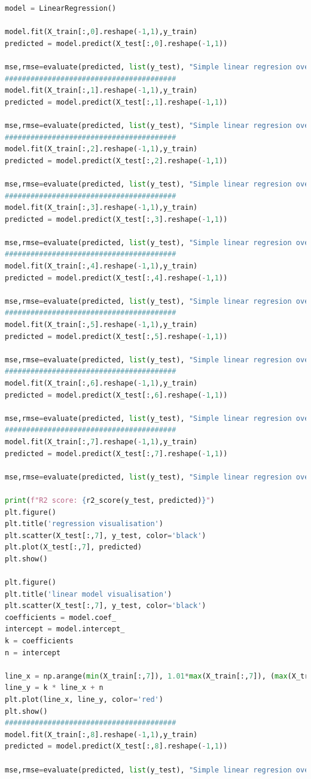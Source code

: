 \documentclass[fontsize=12bp, paper=a4]{scrarticle}
\begin{document}
\begin{lstlisting}[language=Python, caption=Postupak evaluacija naspram svakog feature-a ponaosob.]
model = LinearRegression()

model.fit(X_train[:,0].reshape(-1,1),y_train)
predicted = model.predict(X_test[:,0].reshape(-1,1))

mse,rmse=evaluate(predicted, list(y_test), "Simple linear regresion over longitude")
########################################
model.fit(X_train[:,1].reshape(-1,1),y_train)
predicted = model.predict(X_test[:,1].reshape(-1,1))

mse,rmse=evaluate(predicted, list(y_test), "Simple linear regresion over latitude")
########################################
model.fit(X_train[:,2].reshape(-1,1),y_train)
predicted = model.predict(X_test[:,2].reshape(-1,1))

mse,rmse=evaluate(predicted, list(y_test), "Simple linear regresion over housing_median_age")
########################################
model.fit(X_train[:,3].reshape(-1,1),y_train)
predicted = model.predict(X_test[:,3].reshape(-1,1))

mse,rmse=evaluate(predicted, list(y_test), "Simple linear regresion over total_rooms")
########################################
model.fit(X_train[:,4].reshape(-1,1),y_train)
predicted = model.predict(X_test[:,4].reshape(-1,1))

mse,rmse=evaluate(predicted, list(y_test), "Simple linear regresion over total_bedrooms")
########################################
model.fit(X_train[:,5].reshape(-1,1),y_train)
predicted = model.predict(X_test[:,5].reshape(-1,1))

mse,rmse=evaluate(predicted, list(y_test), "Simple linear regresion over population")
########################################
model.fit(X_train[:,6].reshape(-1,1),y_train)
predicted = model.predict(X_test[:,6].reshape(-1,1))

mse,rmse=evaluate(predicted, list(y_test), "Simple linear regresion over households")
########################################
model.fit(X_train[:,7].reshape(-1,1),y_train)
predicted = model.predict(X_test[:,7].reshape(-1,1))

mse,rmse=evaluate(predicted, list(y_test), "Simple linear regresion over median_income")

print(f"R2 score: {r2_score(y_test, predicted)}")
plt.figure()
plt.title('regression visualisation')
plt.scatter(X_test[:,7], y_test, color='black')
plt.plot(X_test[:,7], predicted)
plt.show()

plt.figure()
plt.title('linear model visualisation')
plt.scatter(X_test[:,7], y_test, color='black')
coefficients = model.coef_
intercept = model.intercept_
k = coefficients
n = intercept

line_x = np.arange(min(X_train[:,7]), 1.01*max(X_train[:,7]), (max(X_train[:,7])- min(X_train[:,7]))/10)
line_y = k * line_x + n
plt.plot(line_x, line_y, color='red')
plt.show()
########################################
model.fit(X_train[:,8].reshape(-1,1),y_train)
predicted = model.predict(X_test[:,8].reshape(-1,1))

mse,rmse=evaluate(predicted, list(y_test), "Simple linear regresion over ocean_proximity")
\end{lstlisting}
\end{document}
